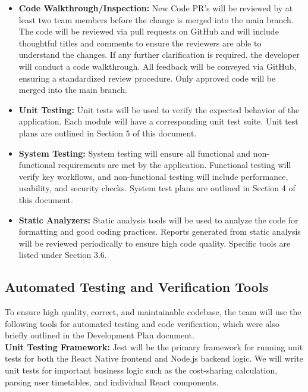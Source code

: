 \documentclass[12pt, titlepage]{article}
\begin{document}
\begin{itemize}
  \item \textbf{Code Walkthrough/Inspection:} 
  New Code PR’s will be reviewed by at least two team members before the change is merged into the main branch. 
  The code will be reviewed via pull requests on GitHub and will include thoughtful titles and comments to ensure the reviewers are able to understand the changes. 
  If any further clarification is required, the developer will conduct a code walkthrough. 
  All feedback will be conveyed via GitHub, ensuring a standardized review procedure. 
  Only approved code will be merged into the main branch.

  \item \textbf{Unit Testing:} 
  Unit tests will be used to verify the expected behavior of the application. 
  Each module will have a corresponding unit test suite. 
  Unit test plans are outlined in Section 5 of this document.

  \item \textbf{System Testing:} 
  System testing will ensure all functional and non-functional requirements are met by the application. 
  Functional testing will verify key workflows, and non-functional testing will include performance, usability, and security checks. 
  System test plans are outlined in Section 4 of this document.

  \item \textbf{Static Analyzers:} 
  Static analysis tools will be used to analyze the code for formatting and good coding practices. 
  Reports generated from static analysis will be reviewed periodically to ensure high code quality. 
  Specific tools are listed under Section 3.6.
\end{itemize}

\subsection{Automated Testing and Verification Tools}

To ensure high quality, correct, and maintainable codebase, the team will use the following tools for automated testing and code verification, which were also briefly outlined in the Development Plan document. \\ 

\noindent \textbf{Unit Testing Framework:} Jest will be the primary framework for running unit tests for both the React Native frontend and Node.js backend logic. We will write unit tests for important business logic such as the cost-sharing calculation, parsing user timetables, and individual React components. \\
 
\end{document}
